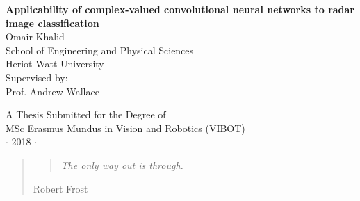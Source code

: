 
\newpage
\thispagestyle{empty}

\vspace*{2cm}
\begin{center}
{\Large\bf Applicability of complex-valued convolutional neural networks to radar image classification\\} \vspace{2cm} {\large
Omair Khalid\\
\vspace{2cm}
School of Engineering and Physical Sciences \\
Heriot-Watt University\\
\vspace{2cm}
Supervised by: \\
\centering Prof. Andrew Wallace
}

\end{center}

\vspace{5cm}
\begin{center}
{\large A Thesis Submitted for the Degree of \\MSc Erasmus Mundus
in Vision and Robotics (VIBOT) \\\vspace{0.3cm} $\cdot$ 2018
$\cdot$}
\end{center}
\singlespacing


\begin{abstract}
The abstract is very abstract as of now.

\vspace*{5cm}

\end{abstract}

\begin{quote}
\vspace*{\fill}
\begin{center}
\begin{quote}
\centering \it The only way out is through.
\end{quote}
\end{center}
\hfill{\small Robert Frost}
\vspace*{\fill}

\end{quote}


